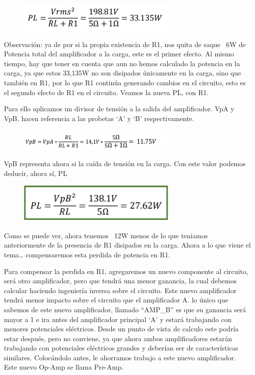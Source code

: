 \documentclass[../main.tex]{subfiles}
\begin{document}
	\begin{figure}[H]
		\includegraphics[width=0.7\textwidth]{imagen7.png}
		\centering
	\end{figure}
	Observación: ya de por si la propia existencia de R1, nos quita de saque ~6W 
	de Potencia total del amplificador a la carga, este es el primer efecto. Al 
	mismo tiempo, hay que tener en cuenta que aun no hemos calculado la potencia 
	en la carga, ya que estos 33,135W no son disipados únicamente en la carga, 
	sino que también en R1, por lo que R1 continúa generando cambios en el 
	circuito, esto es el segundo efecto de R1 en el circuito.
	Veamos la nueva PL, con R1.

	Para ello aplicamos un divisor de tensión a la salida del amplificador. VpA y VpB, 
	hacen referencia a las probetas ‘A’ y ‘B’ respectivamente.

	\begin{figure}[H]
		\includegraphics[width=0.7\textwidth]{imagen8.png}
		\centering
	\end{figure}

	VpB representa ahora si la caída de tensión en la carga. Con este valor podemos 
	deducir, ahora sí, PL
	\begin{figure}[H]
		\includegraphics[width=0.7\textwidth]{imagen9.png}
		\centering
	\end{figure}

	Como se puede ver, ahora tenemos ~12W menos de lo que teníamos anteriormente de la 
	presencia de R1 disipados en la carga. Ahora a lo que viene el tema… compensaremos 
	esta perdida de potencia en R1.

	Para compensar la perdida en R1, agregaremos un nuevo componente al circuito, será 
	otro amplificador, pero que tendrá una menor ganancia, la cual debemos calcular 
	haciendo ingeniería inversa sobre el circuito. Este nuevo amplificador tendrá 
	menor impacto sobre el circuito que el amplificador A. lo único que sabemos de 
	este nuevo amplificador, llamado ``AMP\_B'' es que su ganancia será mayor a 1 e ira 
	antes del amplificador principal ‘A’ y estará trabajando con menores potenciales 
	eléctricos. Desde un punto de vista de calculo este podría estar después, pero no 
	conviene, ya que ahora ambos amplificadores estarán trabajando con potenciales 
	eléctricos grandes y deberían ser de características similares. Colocándolo antes, 
	le ahorramos trabajo a este nuevo amplificador. Este nuevo Op-Amp se llama Pre-Amp.
\end{document}
